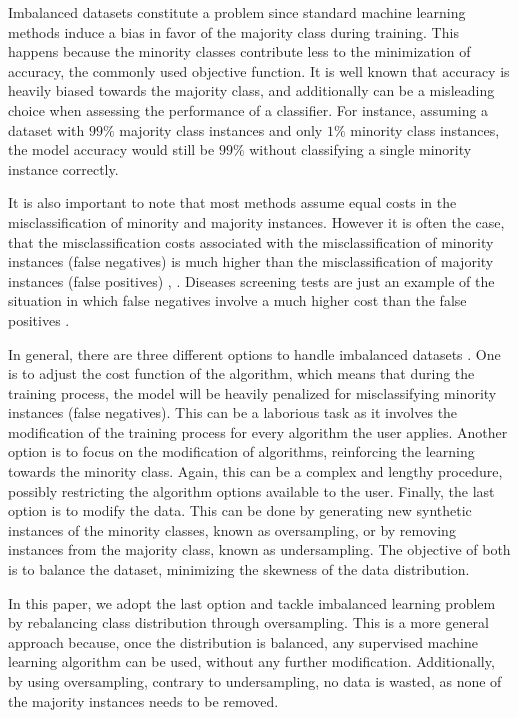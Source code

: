 \documentclass[parskip=full]{scrartcl}
\begin{document}
Imbalanced datasets constitute a problem since standard machine learning methods induce a bias in favor of the majority class during training. This happens because the minority classes contribute less to the minimization of accuracy, the commonly used objective function. It is well known that accuracy is heavily biased towards the majority class, and additionally can be a misleading choice when assessing the performance of a classifier. For instance, assuming a dataset with $ 99\% $ majority class instances and only $ 1\% $ minority class instances, the model accuracy would still be $ 99\% $ without classifying a single minority instance correctly.

It is also important to note that most methods assume equal costs in the misclassification of minority and majority instances. However it is often the case, that the misclassification costs associated with the misclassification of minority instances (false negatives) is much higher than the misclassification of majority instances (false positives) \cite{Domingos1999}, \cite{Ting2002}. Diseases screening tests are just an example of the situation in which false negatives involve a much higher cost than the false positives \cite{Wan2014}.

In general, there are three different options to handle imbalanced datasets \cite{Fernandez2013}. One is to adjust the cost function of the algorithm, which means that during the training process, the model will be heavily penalized for misclassifying minority instances (false negatives). This can be a laborious task as it involves the modification of the training process for every algorithm the user applies. Another option is to focus on the modification of algorithms, reinforcing the learning towards the minority class. Again, this can be a complex and lengthy procedure, possibly restricting the algorithm options available to the user. Finally, the last option is to modify the data. This can be done by generating new synthetic instances of the minority classes, known as oversampling, or by removing instances from the majority class, known as undersampling. The objective of both is to balance the dataset, minimizing the skewness of the data distribution.

In this paper, we adopt the last option and tackle imbalanced learning problem by rebalancing class distribution through oversampling. This is a more general approach because, once the distribution is balanced, any supervised machine learning algorithm can be used, without any further modification. Additionally, by using oversampling, contrary to undersampling, no data is wasted, as none of the majority instances needs to be removed.
\end{document}
